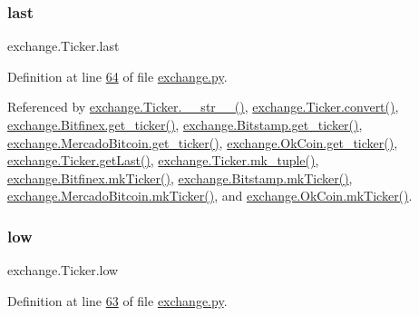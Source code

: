 \mbox{\label{classexchange_1_1_ticker_add7c2d95fa790dcdffddae2e584ce5f5}} 
\subsubsection{\texorpdfstring{last}{last}}
{\footnotesize\ttfamily exchange.\+Ticker.\+last}



Definition at line \hyperlink{exchange_8py_source_l00064}{64} of file \hyperlink{exchange_8py_source}{exchange.\+py}.



Referenced by \hyperlink{exchange_8py_source_l00136}{exchange.\+Ticker.\+\_\+\+\_\+str\+\_\+\+\_\+()}, \hyperlink{exchange_8py_source_l00069}{exchange.\+Ticker.\+convert()}, \hyperlink{exchange_8py_source_l00439}{exchange.\+Bitfinex.\+get\+\_\+ticker()}, \hyperlink{exchange_8py_source_l00511}{exchange.\+Bitstamp.\+get\+\_\+ticker()}, \hyperlink{exchange_8py_source_l00651}{exchange.\+Mercado\+Bitcoin.\+get\+\_\+ticker()}, \hyperlink{exchange_8py_source_l00716}{exchange.\+Ok\+Coin.\+get\+\_\+ticker()}, \hyperlink{exchange_8py_source_l00112}{exchange.\+Ticker.\+get\+Last()}, \hyperlink{exchange_8py_source_l00121}{exchange.\+Ticker.\+mk\+\_\+tuple()}, \hyperlink{exchange_8py_source_l00453}{exchange.\+Bitfinex.\+mk\+Ticker()}, \hyperlink{exchange_8py_source_l00525}{exchange.\+Bitstamp.\+mk\+Ticker()}, \hyperlink{exchange_8py_source_l00665}{exchange.\+Mercado\+Bitcoin.\+mk\+Ticker()}, and \hyperlink{exchange_8py_source_l00730}{exchange.\+Ok\+Coin.\+mk\+Ticker()}.

\mbox{\label{classexchange_1_1_ticker_a1c1f26a47a82fc799fcebf158e104405}} 
\subsubsection{\texorpdfstring{low}{low}}
{\footnotesize\ttfamily exchange.\+Ticker.\+low}



Definition at line \hyperlink{exchange_8py_source_l00063}{63} of file \hyperlink{exchange_8py_source}{exchange.\+py}.



